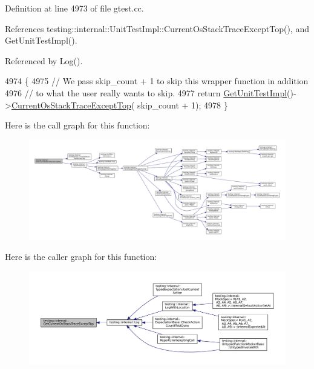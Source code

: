 Definition at line 4973 of file gtest.\+cc.



References testing\+::internal\+::\+Unit\+Test\+Impl\+::\+Current\+Os\+Stack\+Trace\+Except\+Top(), and Get\+Unit\+Test\+Impl().



Referenced by Log().


\begin{DoxyCode}
4974                                                             \{
4975   \textcolor{comment}{// We pass skip\_count + 1 to skip this wrapper function in addition}
4976   \textcolor{comment}{// to what the user really wants to skip.}
4977   \textcolor{keywordflow}{return} \hyperlink{namespacetesting_1_1internal_a9bd0caf5d16512de38b39599c13ee634}{GetUnitTestImpl}()->\hyperlink{classtesting_1_1internal_1_1UnitTestImpl_a61c0a51ac4e57d9f884f646ca6dd2210}{CurrentOsStackTraceExceptTop}(
      skip\_count + 1);
4978 \}
\end{DoxyCode}
Here is the call graph for this function\+:
\nopagebreak
\begin{figure}[H]
\begin{center}
\leavevmode
\includegraphics[width=350pt]{namespacetesting_1_1internal_aeb475922b8cd1e6c60ac052bbc396e62_cgraph}
\end{center}
\end{figure}
Here is the caller graph for this function\+:
\nopagebreak
\begin{figure}[H]
\begin{center}
\leavevmode
\includegraphics[width=350pt]{namespacetesting_1_1internal_aeb475922b8cd1e6c60ac052bbc396e62_icgraph}
\end{center}
\end{figure}
\mbox{\label{namespacetesting_1_1internal_a71fdd20a0686bea3dc0cdcd95e0bca1c}} 
